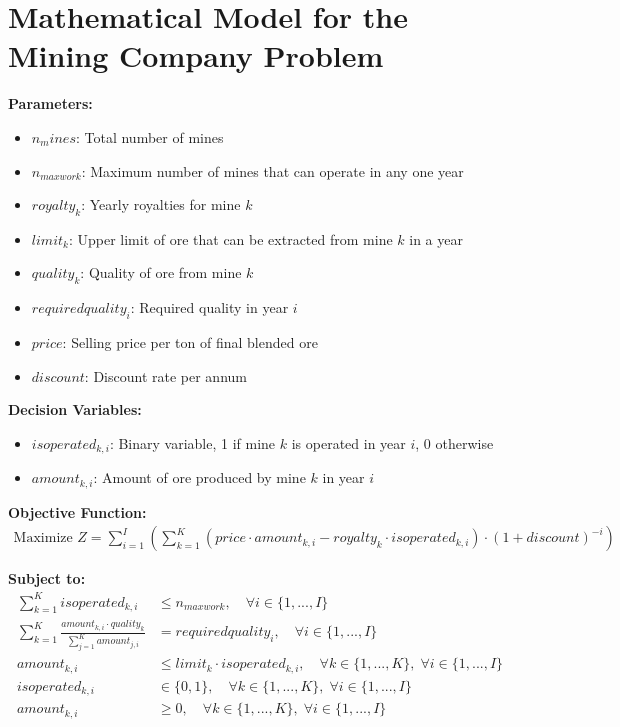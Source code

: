 \documentclass{article}
\begin{document}
\section*{Mathematical Model for the Mining Company Problem}

\textbf{Parameters:}
\begin{itemize}
    \item $n_mines$: Total number of mines
    \item $n_{maxwork}$: Maximum number of mines that can operate in any one year
    \item $royalty_k$: Yearly royalties for mine $k$
    \item $limit_k$: Upper limit of ore that can be extracted from mine $k$ in a year
    \item $quality_k$: Quality of ore from mine $k$
    \item $requiredquality_i$: Required quality in year $i$
    \item $price$: Selling price per ton of final blended ore
    \item $discount$: Discount rate per annum
\end{itemize}

\textbf{Decision Variables:}
\begin{itemize}
    \item $isoperated_{k,i}$: Binary variable, 1 if mine $k$ is operated in year $i$, 0 otherwise
    \item $amount_{k,i}$: Amount of ore produced by mine $k$ in year $i$
\end{itemize}

\textbf{Objective Function:}
\begin{align*}
    \text{Maximize } Z = \sum_{i=1}^{I} \left( \sum_{k=1}^{K} (price \cdot amount_{k,i} - royalty_k \cdot isoperated_{k,i}) \cdot (1 + discount)^{-i} \right)
\end{align*}

\textbf{Subject to:}
\begin{align}
    \sum_{k=1}^{K} isoperated_{k,i} &\leq n_{maxwork}, \quad \forall i \in \{1,...,I\} \label{eq:max_mines}\\
    \sum_{k=1}^{K} \frac{amount_{k,i} \cdot quality_k}{\sum_{j=1}^{K} amount_{j,i}} &= requiredquality_i, \quad \forall i \in \{1,...,I\} \label{eq:quality_constraint}\\
    amount_{k,i} &\leq limit_k \cdot isoperated_{k,i}, \quad \forall k \in \{1,...,K\}, \; \forall i \in \{1,...,I\} \label{eq:limit_constraint}\\
    isoperated_{k,i} &\in \{0, 1\}, \quad \forall k \in \{1,...,K\}, \; \forall i \in \{1,...,I\} \label{eq:binary_constraint}\\
    amount_{k,i} &\geq 0, \quad \forall k \in \{1,...,K\}, \; \forall i \in \{1,...,I\} \label{eq:nonnegativity}
\end{align}
\end{document}
